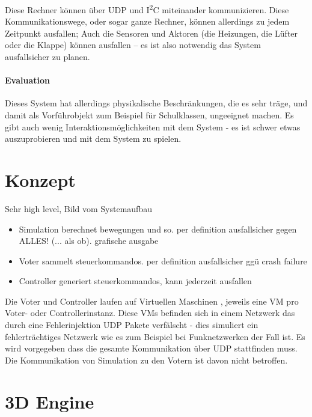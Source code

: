 \documentclass[
    12pt,
    bibliography=totoc,
    ngerman,
	enabledeprecatedfontcommands
]{scrartcl}
\begin{document}
Diese Rechner k{\"{o}}nnen {\"{u}}ber UDP und I\textsuperscript{2}C miteinander kommunizieren. Diese Kommunikationswege, oder sogar ganze Rechner, k{\"{o}}nnen
allerdings zu jedem Zeitpunkt ausfallen; Auch die Sensoren und Aktoren (die Heizungen, die L{\"{u}}fter oder die Klappe) k{\"{o}}nnen ausfallen -- es ist also notwendig das System ausfallsicher zu planen.


\paragraph{Evaluation} Dieses System hat allerdings physikalische Beschr{\"{a}}nkungen, die es sehr
tr{\"{a}}ge, und damit als Vorf{\"{u}}hrobjekt zum Beispiel f{\"{u}}r Schulklassen,
ungeeignet machen. Es gibt auch wenig Interaktionsm{\"{o}}glichkeiten mit dem System - es ist schwer etwas auszuprobieren und
mit dem System zu spielen.

\clearpage
\section{Konzept}
Sehr high level, Bild vom Systemaufbau

\begin{itemize}
\item Simulation berechnet bewegungen und so. per definition ausfallsicher gegen ALLES! (... als ob). grafische ausgabe
\item Voter sammelt steuerkommandos. per definition ausfallsicher ggü crash failure
\item Controller generiert steuerkommandos, kann jederzeit ausfallen
\end{itemize}

Die Voter und Controller laufen auf Virtuellen Maschinen , jeweils eine VM pro Voter- oder Controllerinstanz. Diese VMs befinden sich in einem Netzwerk das durch eine Fehlerinjektion UDP Pakete verf{\"{a}}lscht - dies simuliert ein fehlertr{\"{a}}chtiges Netzwerk wie es zum Beispiel bei Funknetzwerken der Fall ist. Es wird vorgegeben dass die gesamte Kommunikation {\"{u}}ber UDP stattfinden muss.
Die Kommunikation von Simulation zu den Votern ist davon nicht betroffen.

\clearpage
\section{3D Engine}
\end{document}
